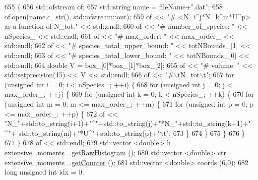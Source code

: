\begin{DoxyCode}
655                                                                                \{
656     std::ofstream of;
657     std::string name = fileName+\textcolor{stringliteral}{".dat"};
658     of.open(name.c\_str(), std::ofstream::out);
659     of << \textcolor{stringliteral}{"# <N\_i^j*N\_k^m*U^p> as a function of N\_tot."} << std::endl;
660     of << \textcolor{stringliteral}{"# number\_of\_species: "} << nSpecies\_ << std::endl;
661     of << \textcolor{stringliteral}{"# max\_order: "} << max\_order\_ << std::endl;
662     of << \textcolor{stringliteral}{"# species\_total\_upper\_bound: "} << totNBounds\_[1] << std::endl;
663     of << \textcolor{stringliteral}{"# species\_total\_lower\_bound: "} << totNBounds\_[0] << std::endl;
664     \textcolor{keywordtype}{double} V = box\_[0]*box\_[1]*box\_[2];
665     of << \textcolor{stringliteral}{"# volume: "} << std::setprecision(15) << V << std::endl;
666     of << \textcolor{stringliteral}{"#\(\backslash\)tN\_tot\(\backslash\)t"};
667     \textcolor{keywordflow}{for} (\textcolor{keywordtype}{unsigned} \textcolor{keywordtype}{int} i = 0; i < nSpecies\_; ++i) \{
668         \textcolor{keywordflow}{for} (\textcolor{keywordtype}{unsigned} \textcolor{keywordtype}{int} j = 0; j <= max\_order\_; ++j) \{
669             \textcolor{keywordflow}{for} (\textcolor{keywordtype}{unsigned} \textcolor{keywordtype}{int} k = 0; k < nSpecies\_; ++k) \{
670                 \textcolor{keywordflow}{for} (\textcolor{keywordtype}{unsigned} \textcolor{keywordtype}{int} m = 0; m <= max\_order\_; ++m) \{
671                     \textcolor{keywordflow}{for} (\textcolor{keywordtype}{unsigned} \textcolor{keywordtype}{int} p = 0; p <= max\_order\_; ++p) \{
672                         of << \textcolor{stringliteral}{"N\_"}+std::to\_string(i+1)+\textcolor{stringliteral}{"^"}+std::to\_string(j)+\textcolor{stringliteral}{"*N\_"}+std::to\_string(k+1)+\textcolor{stringliteral}{"^"}+
      std::to\_string(m)+\textcolor{stringliteral}{"*U^"}+std::to\_string(p)+\textcolor{stringliteral}{"\(\backslash\)t"};
673                     \}
674                 \}
675             \}
676         \}
677     \}
678     of << std::endl;
679     std::vector <double> h = extensive\_moments\_.\hyperlink{classhistogram_afa81289dc32207eb3c44f8bd746f0d1d}{getRawHistogram} ();
680     std::vector <double> ctr = extensive\_moments\_.\hyperlink{classhistogram_a7d3541bd86551053f9fda7b5ae81e3e8}{getCounter} ();
681     std::vector <double> coords (6,0);
682     \textcolor{keywordtype}{long} \textcolor{keywordtype}{unsigned} \textcolor{keywordtype}{int} idx = 0;

\end{DoxyCode}
